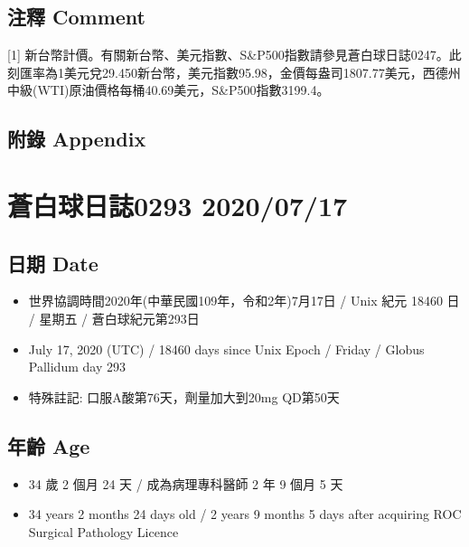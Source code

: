 \documentclass[a5paper, 11pt
]{book}
\providecommand{\tightlist}{%
  \setlength{\itemsep}{0pt}\setlength{\parskip}{0pt}}
\begin{document}
\hypertarget{ux6ce8ux91cb-comment-40}{%
\subsection{注釋 Comment}\label{ux6ce8ux91cb-comment-40}}

{[}1{]}
新台幣計價。有關新台幣、美元指數、S\&P500指數請參見蒼白球日誌0247。此刻匯率為1美元兌29.450新台幣，美元指數95.98，金價每盎司1807.77美元，西德州中級(WTI)原油價格每桶40.69美元，S\&P500指數3199.4。

\hypertarget{ux9644ux9304-appendix-40}{%
\subsection{附錄 Appendix}\label{ux9644ux9304-appendix-40}}

\hypertarget{ux84bcux767dux7403ux65e5ux8a8c0293-20200717}{%
\section{蒼白球日誌0293
2020/07/17}\label{ux84bcux767dux7403ux65e5ux8a8c0293-20200717}}

\hypertarget{ux65e5ux671f-date-41}{%
\subsection{日期 Date}\label{ux65e5ux671f-date-41}}

\begin{itemize}
\tightlist
\item
  世界協調時間2020年(中華民國109年，令和2年)7月17日 / Unix 紀元 18460 日
  / 星期五 / 蒼白球紀元第293日
\item
  July 17, 2020 (UTC) / 18460 days since Unix Epoch / Friday / Globus
  Pallidum day 293
\item
  特殊註記: 口服A酸第76天，劑量加大到20mg QD第50天
\end{itemize}

\hypertarget{ux5e74ux9f61-age-41}{%
\subsection{年齡 Age}\label{ux5e74ux9f61-age-41}}

\begin{itemize}
\tightlist
\item
  34 歲 2 個月 24 天 / 成為病理專科醫師 2 年 9 個月 5 天
\item
  34 years 2 months 24 days old / 2 years 9 months 5 days after
  acquiring ROC Surgical Pathology Licence
\end{itemize}
\end{document}
